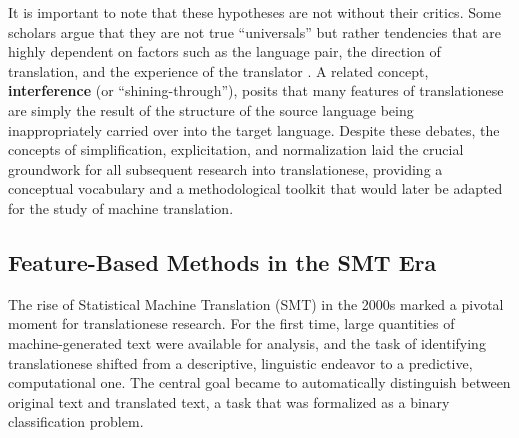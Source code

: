 \documentclass[11pt,a4paper]{article}
\begin{document}
It is important to note that these hypotheses are not without their critics. Some scholars argue that they are not true ``universals'' but rather tendencies that are highly dependent on factors such as the language pair, the direction of translation, and the experience of the translator \cite{zanettin2013corpus}. A related concept, \textbf{interference} (or ``shining-through''), posits that many features of translationese are simply the result of the structure of the source language being inappropriately carried over into the target language. Despite these debates, the concepts of simplification, explicitation, and normalization laid the crucial groundwork for all subsequent research into translationese, providing a conceptual vocabulary and a methodological toolkit that would later be adapted for the study of machine translation.

\subsection{Feature-Based Methods in the SMT Era}

The rise of Statistical Machine Translation (SMT) in the 2000s marked a pivotal moment for translationese research. For the first time, large quantities of machine-generated text were available for analysis, and the task of identifying translationese shifted from a descriptive, linguistic endeavor to a predictive, computational one. The central goal became to automatically distinguish between original text and translated text, a task that was formalized as a binary classification problem.
\end{document}
